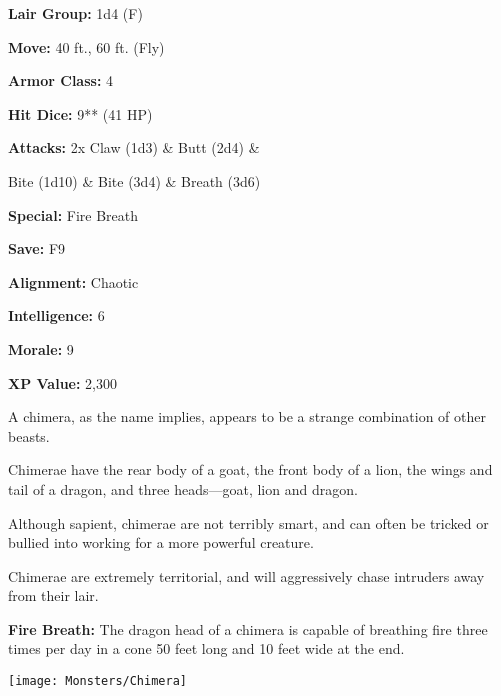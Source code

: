 \begin{multicols*}{2}
{\textbf{Lair Group:} 1d4 (F)

\textbf{Move:} 40 ft., 60 ft. (Fly)

\textbf{Armor Class:} 4

\textbf{Hit Dice:} 9** (41 HP)

\textbf{Attacks:} 2x Claw (1d3) \& Butt (2d4) \& 

Bite (1d10) \& Bite (3d4) \& Breath (3d6)

\textbf{Special:} Fire Breath

\textbf{Save:} F9

\textbf{Alignment:} Chaotic

\textbf{Intelligence:} 6

\textbf{Morale:} 9

\textbf{XP Value:} 2,300}

A chimera, as the name implies, appears to be a strange combination of other beasts.

Chimerae have the rear body of a goat, the front body of a lion, the wings and tail of a dragon, and three heads—goat, lion and dragon.

Although sapient, chimerae are not terribly smart, and can often be tricked or bullied into working for a more powerful creature.

Chimerae are extremely territorial, and will aggressively chase intruders away from their lair.

\textbf{Fire Breath:} The dragon head of a chimera is capable of breathing fire three times per day in a cone 50 feet long and 10 feet wide at the end.

\texttt{[image: Monsters/Chimera]}


\end{multicols*}
